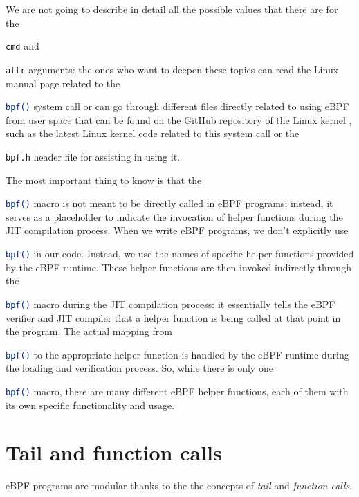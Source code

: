 We are not going to describe in detail all the possible values that there are for the \raggedright\colorbox{backcolour}{\lstinline[style=commandline, language=bash]|cmd|} and \raggedright\colorbox{backcolour}{\lstinline[style=commandline, language=bash]|attr|} arguments: the ones who want to deepen these topics can read the Linux manual page related to the \raggedright\colorbox{backcolour}{\lstinline[style=commandline, language=bash]|bpf()|} system call \cite{BPFManPage} or can go through different files directly related to using eBPF from user space that can be found on the GitHub repository of the Linux kernel \cite{LinuxKernelRepo}, such as the latest Linux kernel code related to this system call \cite{BPFKernelCode} or the \raggedright\colorbox{backcolour}{\lstinline[style=commandline, language=bash]|bpf.h|} header file \cite{BPFHeader} for assisting in using it.

The most important thing to know is that the \raggedright\colorbox{backcolour}{\lstinline[style=commandline, language=bash]|bpf()|} macro is not meant to be directly called in eBPF programs; instead, it serves as a placeholder to indicate the invocation of helper functions during the JIT compilation process.
When we write eBPF programs, we don't explicitly use \raggedright\colorbox{backcolour}{\lstinline[style=commandline, language=bash]|bpf()|} in our code. 
Instead, we use the names of specific helper functions provided by the eBPF runtime.
These helper functions are then invoked indirectly through the \raggedright\colorbox{backcolour}{\lstinline[style=commandline, language=bash]|bpf()|} macro during the JIT compilation process: it essentially tells the eBPF verifier and JIT compiler that a helper function is being called at that point in the program. 
The actual mapping from \raggedright\colorbox{backcolour}{\lstinline[style=commandline, language=bash]|bpf()|} to the appropriate helper function is handled by the eBPF runtime during the loading and verification process.
So, while there is only one \raggedright\colorbox{backcolour}{\lstinline[style=commandline, language=bash]|bpf()|} macro, there are many different eBPF helper functions, each of them with its own specific functionality and usage.

\section{Tail and function calls}

eBPF programs are modular thanks to the the concepts of \textit{tail} and \textit{function calls}.
 
